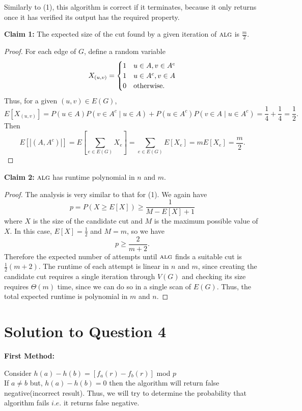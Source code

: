 \documentclass[11pt]{article}
\newcommand{\alg}{\textsc{alg}}
\begin{document}
\begin{enumerate}[(1)]
		Similarly to (1), this algorithm is correct if it terminates, because it only returns once it has verified its output has the required property.
		
		{\bf Claim 1:} The expected size of the cut found by a given iteration of $\alg$ is $\frac{m}{2}$.
		
		\begin{proof}
			For each edge of $G$, define a random variable \[X_{(u,v)} = \begin{cases}1 & u \in A, v \in A^c\\ 1 & u \in A^c, v \in A\\ 0 & \textnormal{otherwise}.\end{cases}\]
			Thus, for a given $(u,v) \in E(G)$, \[E[X_{(u,v)}] = P(u \in A)P(v \in A^c \mid u \in A) + P(u \in A^c)P(v \in A \mid u \in A^c) = \frac{1}{4} + \frac{1}{4} = \frac{1}{2}.\]
			Then \[E\left[|(A, A^c)|\right] = E\left[\sum_{e \in E(G)} X_e\right] = \sum_{e \in E(G)}E[X_e] = mE[X_e] = \frac{m}{2}.\]
		\end{proof}
		
		{\bf Claim 2:} $\alg$ has runtime polynomial in $n$ and $m$.
		\begin{proof}
			The analysis is very similar to that for (1).
			We again have \[p = P(X \geq E[X]) \geq \frac{1}{M - E[X] + 1}\] where $X$ is the size of the candidate cut and $M$ is the maximum possible value of $X$.
			In this case, $E[X] = \frac{1}{2}$ and $M = m$, so we have \[p \geq \frac{2}{m+2}.\]
			Therefore the expected number of attempts until $\alg$ finds a suitable cut is $\frac{1}{2}(m+2)$.
			The runtime of each attempt is linear in $n$ and $m$, since creating the candidate cut requires a single iteration through $V(G)$ and checking its size requires $\Theta(m)$ time, since we can do so in a single scan of $E(G)$.
			Thus, the total expected runtime is polynomial in $m$ and $n$.
		\end{proof}
	\end{enumerate}
	
	 
	
	\section{Solution to Question 4}
	
	\textbf{First Method:}
	
	Consider $h(a) - h(b) = [f_a(r) - f_b(r)]$ mod $p$ \\
	If $a \neq b$ but, $h(a) - h(b) = 0$ then the algorithm will return false negative(incorrect result). Thus, we will try to determine
	the probability that algorithm fails $i.e.$ it returns false negative.
	
\end{document}
